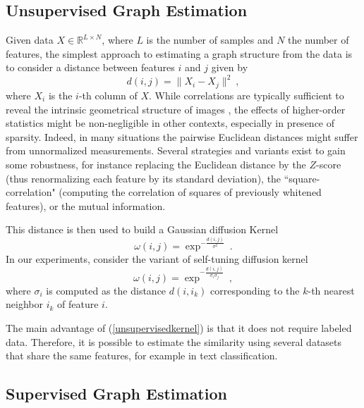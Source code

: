 \documentclass{article} %
\begin{document}
\subsection{ Unsupervised Graph Estimation }

Given data $X \in \mathbb{R}^{L \times N}$, where $L$ is the number of samples and $N$ the number of features,
the simplest approach to estimating a graph structure from the data is to consider a distance between features $i$ and $j$ given by
$$d(i,j) = \| X_i - X_j \|^2~,$$
where $X_i$ is the $i$-th column of $X$. 
While correlations are typically sufficient to reveal the intrinsic geometrical structure of images \cite{roux2008learning}, 
 the effects of higher-order statistics might be non-negligible in other contexts, especially in presence of sparsity. 
Indeed, in many situations the pairwise Euclidean distances might suffer from unnormalized measurements. Several strategies and variants 
exist to gain some robustness, for instance replacing the Euclidean distance by the $Z$-score (thus renormalizing each feature by its standard
deviation), the ``square-correlation" (computing the correlation of squares of previously whitened features), or the mutual information.

This distance is then used to build a Gaussian diffusion Kernel \cite{belkin2001laplacian} 
\begin{equation}
\label{unsupervisedkernel}
\omega(i,j) = \exp^{-\frac{d(i,j)}{\sigma^2}}~.
\end{equation}
In our experiments, consider the variant of self-tuning diffusion kernel \cite{zelnik2004self}
$$\omega(i,j) = \exp^{-\frac{d(i,j)}{\sigma_i \sigma_j}}~,$$
where $\sigma_i$ is computed as the distance $d(i,i_{k})$ corresponding to the $k$-th nearest neighbor $i_{k}$ of feature $i$. 


The main advantage of (\ref{unsupervisedkernel}) is that it does not require labeled data. Therefore, it is possible to estimate 
the similarity using several datasets that share the same features, for example in text classification. 


\subsection{ Supervised Graph Estimation }
\end{document}
